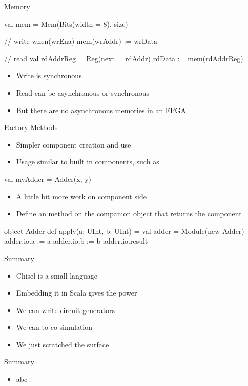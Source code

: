 \begin{frame}[fragile]{Memory}
\begin{chisel}
val mem = Mem(Bits(width = 8), size)

// write
when(wrEna) {
  mem(wrAddr) := wrData
}

// read
val rdAddrReg = Reg(next = rdAddr)
rdData := mem(rdAddrReg)
\end{chisel}
\begin{itemize}
\item Write is synchronous
\item Read can be asynchronous or synchronous
\item But there are no asynchronous memories in an FPGA
\end{itemize}
\end{frame}

\begin{frame}[fragile]{Factory Methods}
\begin{itemize}
\item Simpler component creation and use
\item Usage similar to built in components, such as 
\end{itemize}
\begin{chisel}
val myAdder = Adder(x, y)
\end{chisel}
\begin{itemize}
\item A little bit more work on component side
\item Define an  method on the companion object that returns the component
\end{itemize}
\begin{chisel}
object Adder {
  def apply(a: UInt, b: UInt) = {
    val adder = Module(new Adder)
    adder.io.a := a
    adder.io.b := b
    adder.io.result
  }
}
\end{chisel}
\end{frame}

\begin{frame}[fragile]{Summary}
\begin{itemize}
\item Chisel is a small language
\item Embedding it in Scala gives the power
\item We can write circuit generators
\item We can to co-simulation
\item We just scratched the surface
\end{itemize}
\end{frame}




\begin{frame}[fragile]{Summary}
\begin{itemize}
\item abc
\end{itemize}
\end{frame}
